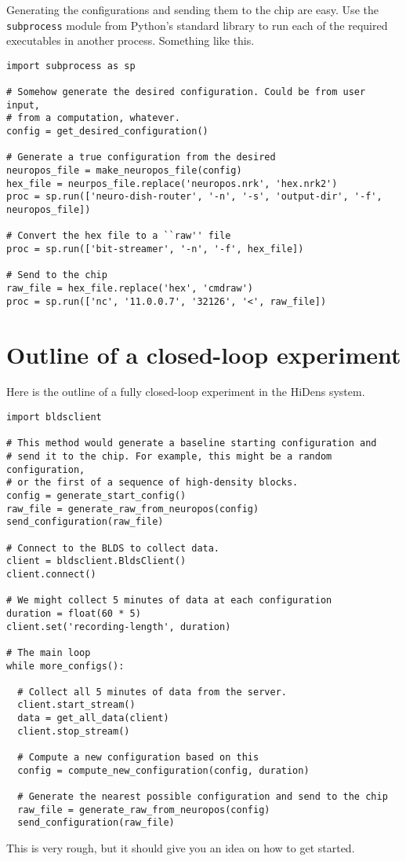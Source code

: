 \documentclass[12pt]{article}
\begin{document}
Generating the configurations and sending them to the chip are easy. Use
the \texttt{subprocess} module from Python's standard library to run each
of the required executables in another process. Something like this.

\begin{verbatim}
import subprocess as sp

# Somehow generate the desired configuration. Could be from user input,
# from a computation, whatever.
config = get_desired_configuration()

# Generate a true configuration from the desired
neuropos_file = make_neuropos_file(config)
hex_file = neurpos_file.replace('neuropos.nrk', 'hex.nrk2')
proc = sp.run(['neuro-dish-router', '-n', '-s', 'output-dir', '-f', neuropos_file])

# Convert the hex file to a ``raw'' file
proc = sp.run(['bit-streamer', '-n', '-f', hex_file])

# Send to the chip
raw_file = hex_file.replace('hex', 'cmdraw')
proc = sp.run(['nc', '11.0.0.7', '32126', '<', raw_file])
\end{verbatim}

\section*{Outline of a closed-loop experiment}

Here is the outline of a fully closed-loop experiment in the HiDens system.

\begin{verbatim}
import bldsclient

# This method would generate a baseline starting configuration and
# send it to the chip. For example, this might be a random configuration,
# or the first of a sequence of high-density blocks.
config = generate_start_config()
raw_file = generate_raw_from_neuropos(config)
send_configuration(raw_file)

# Connect to the BLDS to collect data.
client = bldsclient.BldsClient()
client.connect()

# We might collect 5 minutes of data at each configuration
duration = float(60 * 5)
client.set('recording-length', duration)

# The main loop
while more_configs():

  # Collect all 5 minutes of data from the server.
  client.start_stream()
  data = get_all_data(client)
  client.stop_stream()

  # Compute a new configuration based on this
  config = compute_new_configuration(config, duration)

  # Generate the nearest possible configuration and send to the chip
  raw_file = generate_raw_from_neuropos(config)
  send_configuration(raw_file)
\end{verbatim}

This is very rough, but it should give you an idea on how to get
started.
\end{document}
